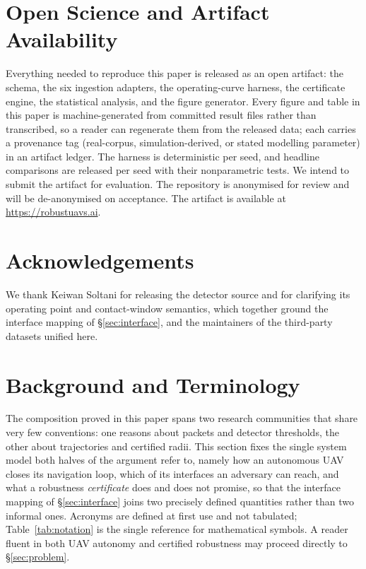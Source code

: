 \section{Open Science and Artifact Availability}
\label{sec:openscience}
Everything needed to reproduce this paper is released as an open artifact: the
schema, the six ingestion adapters, the operating-curve harness, the
certificate engine, the statistical analysis, and the figure generator. Every
figure and table in this paper is machine-generated from committed result files
rather than transcribed, so a reader can regenerate them from the released data;
each carries a provenance tag (real-corpus, simulation-derived, or stated
modelling parameter) in an artifact ledger. The harness is deterministic per
seed, and headline comparisons are released per seed with their nonparametric
tests. We intend to submit the artifact for evaluation.
\ifanon
The repository is anonymised for review and will be de-anonymised on acceptance.
\else
The artifact is available at \url{https://robustuavs.ai}.
\fi

\ifanon\else

\section*{Acknowledgements}
We thank Keiwan Soltani for releasing the  detector source and
for clarifying its operating point and contact-window semantics, which together
ground the interface mapping of \S\ref{sec:interface}, and the maintainers of
the third-party datasets unified here.
\fi




\appendix

\section{Background and Terminology}
\label{sec:background}
The composition proved in this paper spans two research communities that share
very few conventions: one reasons about packets and detector thresholds, the
other about trajectories and certified radii. This section fixes the single
system model both halves of the argument refer to, namely how an autonomous UAV closes
its navigation loop, which of its interfaces an adversary can reach, and what a
robustness \emph{certificate} does and does not promise, so that the interface
mapping of \S\ref{sec:interface} joins two precisely defined quantities rather
than two informal ones. Acronyms are defined at first use and not tabulated;
Table~\ref{tab:notation} is the single reference for mathematical symbols. A
reader fluent in both UAV autonomy and certified robustness may proceed directly
to \S\ref{sec:problem}.

